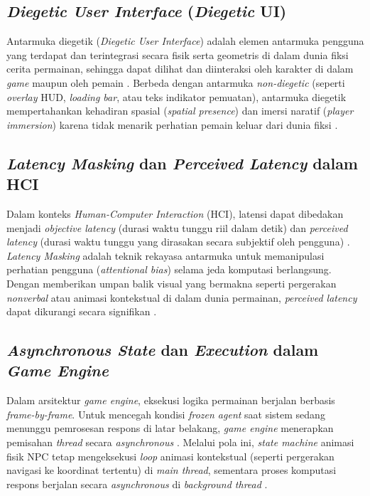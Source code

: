 \subsection{\textit{Diegetic User Interface} (\textit{Diegetic} UI)}
Antarmuka diegetik (\textit{Diegetic User Interface}) adalah elemen antarmuka pengguna yang terdapat dan terintegrasi secara fisik serta geometris di dalam dunia fiksi cerita permainan, sehingga dapat dilihat dan diinteraksi oleh karakter di dalam \textit{game} maupun oleh pemain \citep{andersson2024effects}. Berbeda dengan antarmuka \textit{non-diegetic} (seperti \textit{overlay} HUD, \textit{loading bar}, atau teks indikator pemuatan), antarmuka diegetik mempertahankan kehadiran spasial (\textit{spatial presence}) dan imersi naratif (\textit{player immersion}) karena tidak menarik perhatian pemain keluar dari dunia fiksi \citep{andersson2024effects}.

\subsection{\textit{Latency Masking} dan \textit{Perceived Latency} dalam HCI}
Dalam konteks \textit{Human-Computer Interaction} (HCI), latensi dapat dibedakan menjadi \textit{objective latency} (durasi waktu tunggu riil dalam detik) dan \textit{perceived latency} (durasi waktu tunggu yang dirasakan secara subjektif oleh pengguna) \citep{elfleet2024investigating}. \textit{Latency Masking} adalah teknik rekayasa antarmuka untuk memanipulasi perhatian pengguna (\textit{attentional bias}) selama jeda komputasi berlangsung. Dengan memberikan umpan balik visual yang bermakna seperti pergerakan \textit{nonverbal} atau animasi kontekstual di dalam dunia permainan, \textit{perceived latency} dapat dikurangi secara signifikan \citep{elfleet2024investigating}.

\subsection{\textit{Asynchronous State} dan \textit{Execution} dalam \textit{Game Engine}}
Dalam arsitektur \textit{game engine}, eksekusi logika permainan berjalan berbasis \textit{frame-by-frame}. Untuk mencegah kondisi \textit{frozen agent} saat sistem sedang menunggu pemrosesan respons di latar belakang, \textit{game engine} menerapkan pemisahan \textit{thread} secara \textit{asynchronous} \citep{wei2025mind}. Melalui pola ini, \textit{state machine} animasi fisik NPC tetap mengeksekusi \textit{loop} animasi kontekstual (seperti pergerakan navigasi ke koordinat tertentu) di \textit{main thread}, sementara proses komputasi respons berjalan secara \textit{asynchronous} di \textit{background thread} \citep{wei2025mind}.

